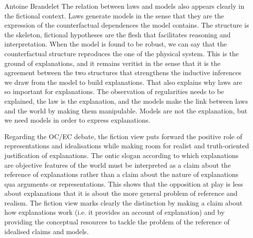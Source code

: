 \begin{artengenv}{Antoine Brandelet}
The relation between laws and models also appears clearly in the fictional context. Laws generate models in the sense that they are the expression of the counterfactual dependences the model contains. The structure is the skeleton, fictional hypotheses are the flesh that facilitates reasoning and interpretation. When the model is found to be robust, we can say that the counterfactual structure reproduces the one of the physical system. This is the ground of explanations, and it remains veritist in the sense that it is the agreement between the two structures that strengthens the inductive inferences we draw from the model to build explanations. That also explains why laws are so important for explanations. The observation of regularities needs to be explained, the law is the explanation, and the models make the link between laws and the world by making them manipulable. Models are not the explanation, but we need models in order to express explanations.

Regarding the OC/EC debate, the fiction view puts forward the positive role of representations and idealisations while making room for realist and truth-oriented justification of explanations. The ontic slogan according to which explanations are objective features of the world must be interpreted as a claim about the reference of explanations rather than a claim about the nature of explanations qua arguments or representations. This shows that the opposition at play is less about explanations that it is about the more general problem of reference and realism. The fiction view marks clearly the distinction by making a claim about how explanations work (i.e. it provides an account of explanation) and by providing the conceptual resources to tackle the problem of the reference of idealised claims and models.


\end{artengenv}
